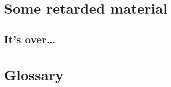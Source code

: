 \documentclass[12pt,mscthesis]{usiinfthesis}
\begin{document}
\appendix %

\chapter{Some retarded material}
\section{It's over\dots}

\backmatter

\chapter{Glossary} %

%
%



\end{document}
